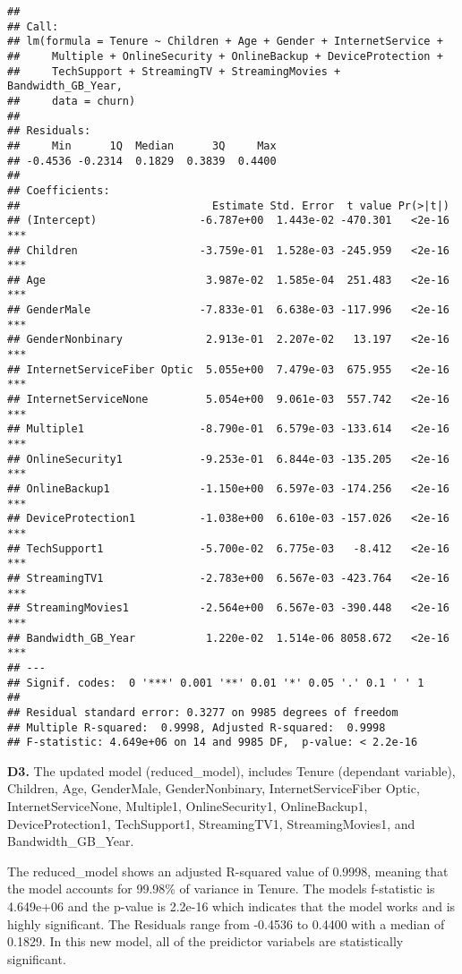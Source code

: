 \documentclass[
]{article}
\begin{document}
\begin{verbatim}
## 
## Call:
## lm(formula = Tenure ~ Children + Age + Gender + InternetService + 
##     Multiple + OnlineSecurity + OnlineBackup + DeviceProtection + 
##     TechSupport + StreamingTV + StreamingMovies + Bandwidth_GB_Year, 
##     data = churn)
## 
## Residuals:
##     Min      1Q  Median      3Q     Max 
## -0.4536 -0.2314  0.1829  0.3839  0.4400 
## 
## Coefficients:
##                              Estimate Std. Error  t value Pr(>|t|)    
## (Intercept)                -6.787e+00  1.443e-02 -470.301   <2e-16 ***
## Children                   -3.759e-01  1.528e-03 -245.959   <2e-16 ***
## Age                         3.987e-02  1.585e-04  251.483   <2e-16 ***
## GenderMale                 -7.833e-01  6.638e-03 -117.996   <2e-16 ***
## GenderNonbinary             2.913e-01  2.207e-02   13.197   <2e-16 ***
## InternetServiceFiber Optic  5.055e+00  7.479e-03  675.955   <2e-16 ***
## InternetServiceNone         5.054e+00  9.061e-03  557.742   <2e-16 ***
## Multiple1                  -8.790e-01  6.579e-03 -133.614   <2e-16 ***
## OnlineSecurity1            -9.253e-01  6.844e-03 -135.205   <2e-16 ***
## OnlineBackup1              -1.150e+00  6.597e-03 -174.256   <2e-16 ***
## DeviceProtection1          -1.038e+00  6.610e-03 -157.026   <2e-16 ***
## TechSupport1               -5.700e-02  6.775e-03   -8.412   <2e-16 ***
## StreamingTV1               -2.783e+00  6.567e-03 -423.764   <2e-16 ***
## StreamingMovies1           -2.564e+00  6.567e-03 -390.448   <2e-16 ***
## Bandwidth_GB_Year           1.220e-02  1.514e-06 8058.672   <2e-16 ***
## ---
## Signif. codes:  0 '***' 0.001 '**' 0.01 '*' 0.05 '.' 0.1 ' ' 1
## 
## Residual standard error: 0.3277 on 9985 degrees of freedom
## Multiple R-squared:  0.9998, Adjusted R-squared:  0.9998 
## F-statistic: 4.649e+06 on 14 and 9985 DF,  p-value: < 2.2e-16
\end{verbatim}

\textbf{D3.} The updated model (reduced\_model), includes Tenure
(dependant variable), Children, Age, GenderMale, GenderNonbinary,
InternetServiceFiber Optic, InternetServiceNone, Multiple1,
OnlineSecurity1, OnlineBackup1, DeviceProtection1, TechSupport1,
StreamingTV1, StreamingMovies1, and Bandwidth\_GB\_Year.~

The reduced\_model shows an adjusted R-squared value of 0.9998, meaning
that the model accounts for 99.98\% of variance in Tenure. The models
f-statistic is 4.649e+06 and the p-value is 2.2e-16 which indicates that
the model works and is highly significant. The Residuals range from
-0.4536 to 0.4400 with a median of 0.1829. In this new model, all of the
preidictor variabels are statistically significant.
\end{document}
